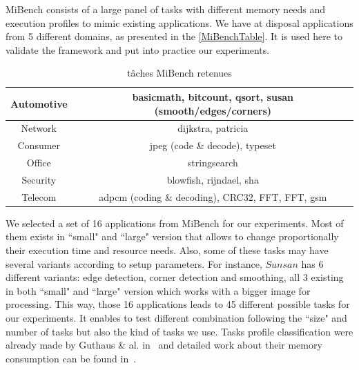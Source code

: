 \documentclass[french, a4paper, 11pt, twoside, pdftex]{StyleThese}
\begin{document}
            MiBench consists of a large panel of tasks with different memory needs and execution profiles to mimic existing applications. We have at disposal applications from 5 different domains, as presented in the \autoref{MiBenchTable}. It is used here to validate the framework and put into practice our experiments.\\
            \begin{table}[!t]
                \renewcommand{\arraystretch}{1.3}
                \caption{tâches MiBench retenues}
                \label{MiBenchTable}
                \centering
                \begin{tabular}{|c||c|}
                    \hline
                    Automotive  & basicmath, bitcount, qsort, susan (smooth/edges/corners)\\
                    \hline
                    Network     & dijkstra, patricia                                        \\
                    \hline
                    Consumer    & jpeg (code \& decode), typeset                            \\
                    \hline
                    Office      & stringsearch                                              \\
                    \hline
                    Security    & blowfish, rijndael, sha                                   \\
                    \hline
                    Telecom     & adpcm (coding \& decoding), CRC32, FFT, FFT\up{-1}, gsm               \\
                    \hline
                \end{tabular}
            \end{table}
            We selected a set of 16 applications from MiBench for our experiments. Most of them exists in ``small" and ``large" version that allows to change proportionally their execution time and resource needs. Also, some of these tasks may have several variants according to setup parameters. For instance, $Sunsan$ has 6 different variants: edge detection, corner detection and smoothing, all 3 existing in both ``small" and ``large" version which works with a bigger image for processing. This way, those 16 applications leads to 45 different possible tasks for our experiments. It enables to test different combination following the ``size" and number of tasks but also the kind of tasks we use.
            Tasks profile classification were already made by Guthaus \& al. in~\cite{guthaus_mibench_2001} and detailed work about their memory consumption can be found in~\cite{blin_understanding_2016}. 
        
\end{document}
